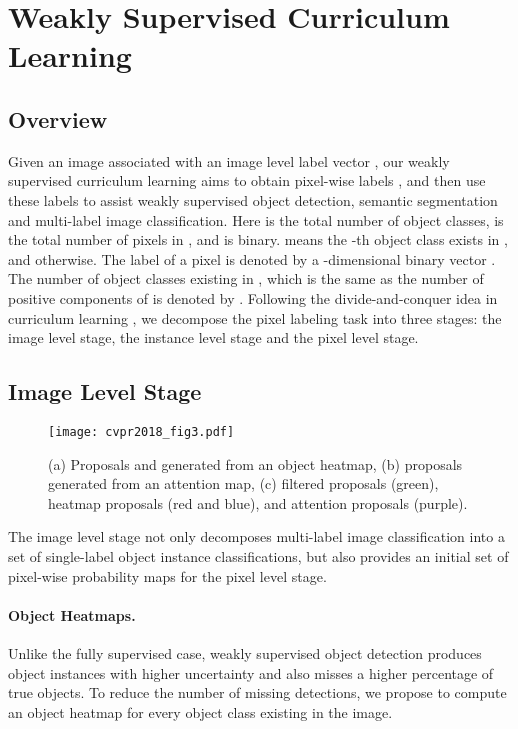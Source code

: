 \documentclass[10pt,twocolumn,letterpaper]{article}
\begin{document}
\section{Weakly Supervised Curriculum Learning}

\subsection{Overview}

Given an image  associated with an image level label vector , our weakly supervised curriculum learning aims to obtain pixel-wise labels , and then use these labels to assist weakly supervised object detection, semantic segmentation and multi-label image classification.
Here  is the total number of object classes,  is the total number of pixels in , and  is binary.  means the -th object class exists in , and  otherwise. The label of a pixel  is denoted by a -dimensional binary vector . The number of object classes existing in , which is the same as the number of positive components of  is denoted by . Following the divide-and-conquer idea in curriculum learning \cite{bengio2009curriculum}, we decompose the pixel labeling task into three stages: the image level stage, the instance level stage and the pixel level stage.

\subsection{Image Level Stage}

\begin{figure}
  \centering
  \texttt{[image: cvpr2018\_fig3.pdf]}
  \caption{(a) Proposals  and  generated from an object heatmap, (b) proposals generated from an attention map, (c) filtered proposals (green), heatmap proposals (red and blue), and attention proposals (purple).}
  \label{Fig:Image Level Stage}
\end{figure}


The image level stage not only decomposes multi-label image classification into a set of single-label object instance classifications, but also provides an initial set of pixel-wise probability maps for the pixel level stage.
\vspace{-5mm}
\paragraph{Object Heatmaps.} Unlike the fully supervised case, weakly supervised object detection produces object instances with higher uncertainty and also misses a higher percentage of true objects. To reduce the number of missing detections, we propose to compute an object heatmap  for every object class existing in the image.
\end{document}
